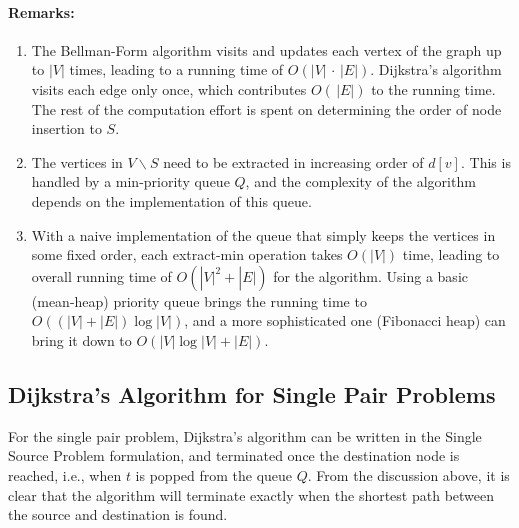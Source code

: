 \paragraph{Remarks:}
\begin{enumerate}
  \item The Bellman-Form algorithm visits and updates each vertex of the graph up to $|V|$ times, leading to a running time of $O(|V|\, \cdot \,|E|)$. Dijkstra's algorithm visits each edge only once, which contributes $O(\,|E|)$ to the running time. The rest of the computation effort is spent on determining the order of node insertion to $S$.
  \item	The vertices in $V\backslash S$ need to be extracted in increasing order of $d[v]$.  This is handled by a min-priority queue $Q$, and the complexity of the algorithm depends on the implementation of this queue.
  \item	With a naive implementation of the queue that simply keeps the vertices in some fixed order, each extract-min operation takes  $O(|V|)$ time, leading to overall running time of $O(|V{|^2} + |E|)$ for the algorithm. Using a basic (mean-heap) priority queue brings the running time to $O((|V| + |E|)\log |V|)$, and a more sophisticated one (Fibonacci heap) can bring it down to  $O(|V|\log |V| + |E|)$.
\end{enumerate}

\subsection{Dijkstra's Algorithm for Single Pair Problems}

For the single pair problem, Dijkstra's algorithm can be written in the Single Source Problem formulation, and terminated once the destination node is reached, i.e., when $t$ is popped from the queue $Q$. From the discussion above, it is clear that the algorithm will terminate exactly when the shortest path between the source and destination is found.


